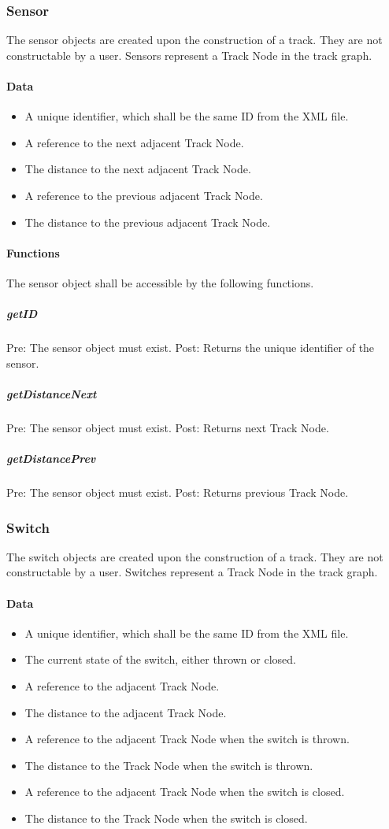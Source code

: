 \documentclass[a4paper,11pt,notitlepage]{article}
\def\TN{Track Node\xspace}
\begin{document}
\subsubsection{Sensor}
The sensor objects are created upon the construction of a track. They are not constructable by a user. Sensors represent a \TN in the track graph.
\paragraph{Data}
\begin{itemize}
\item A unique identifier, which shall be the same ID from the XML file.
\item A reference to the next adjacent \TN.
\item The distance to the next adjacent \TN.
\item A reference to the previous adjacent \TN.
\item The distance to the previous adjacent \TN.
\end{itemize}
\paragraph{Functions}
The sensor object shall be accessible by the following functions.
\subparagraph{getID} Pre: The sensor object must exist. Post: Returns the unique identifier of the sensor.
\subparagraph{getDistanceNext} Pre: The sensor object must exist. Post: Returns next \TN.
\subparagraph{getDistancePrev} Pre: The sensor object must exist. Post: Returns previous \TN.

\subsubsection{Switch}
The switch objects are created upon the construction of a track. They are not constructable by a user. Switches represent a \TN in the track graph.
\paragraph{Data}
\begin{itemize}
\item A unique identifier, which shall be the same ID from the XML file.
\item The current state of the switch, either thrown or closed.
\item A reference to the adjacent \TN.
\item The distance to the adjacent \TN.
\item A reference to the adjacent \TN when the switch is thrown.
\item The distance to the \TN when the switch is thrown.
\item A reference to the adjacent \TN when the switch is closed.
\item The distance to the \TN when the switch is closed.
\end{itemize}
\end{document}
